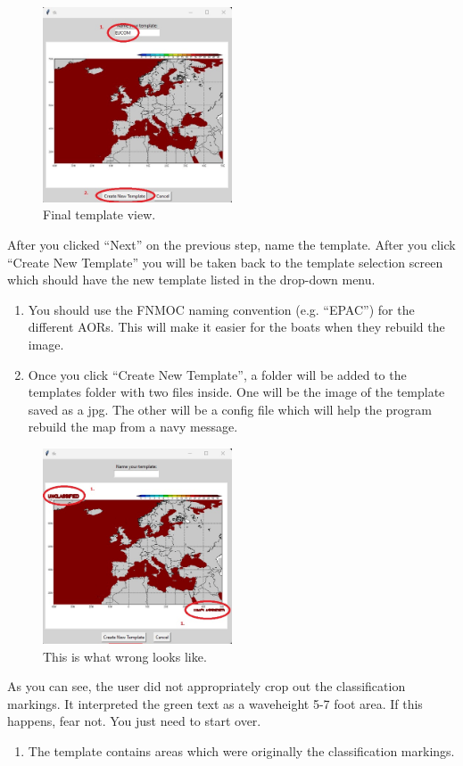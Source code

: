 \newpage
\begin{figure}[H]
    \centering\includegraphics[width=0.5\textwidth]{TeX/Build_Template8.jpg}
    \caption{Final template view.}
\end{figure}
After you clicked ``Next'' on the previous step, name the template. After you click ``Create New Template'' you will be taken back to the template selection screen which should have the new template listed in the drop-down menu.
\begin{enumerate}
    \item You should use the FNMOC naming convention (e.g. ``EPAC'') for the different AORs. This will make it easier for the boats when they rebuild the image.
    \item Once you click ``Create New Template'', a folder will be added to the templates folder with two files inside.  One will be the image of the template saved as a jpg.  The other will be a config file which will help the program rebuild the map from a navy message.
\end{enumerate}


\newpage
\begin{figure}[H]
    \centering\includegraphics[width=0.5\textwidth]{TeX/Build_Template9.jpg}
    \caption{This is what wrong looks like.}
\end{figure}
As you can see, the user did not appropriately crop out the classification markings.  It interpreted the green text as a waveheight 5-7 foot area. If this happens, fear not. You just need to start over.
\begin{enumerate}
    \item The template contains areas which were originally the classification markings.
\end{enumerate}

